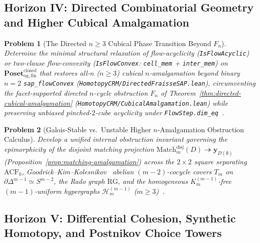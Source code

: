 \documentclass[10pt,twoside,openright]{book}
\theoremstyle{crmplain}
\newtheorem{problem}{Problem}[chapter]
\theoremstyle{crmdef}
\theoremstyle{crmremark}
\begin{document}
\subsection*{Horizon IV: Directed Combinatorial Geometry and Higher Cubical Amalgamation}

\begin{problem}[The Directed $n \ge 3$ Cubical Phase Transition Beyond $F_n$]\label{prob:open-7}
Determine the minimal structural relaxation of flow-acyclicity (\texttt{IsFlowAcyclic}) or two-clause flow-convexity (\texttt{IsFlowConvex}: \texttt{cell\_\allowbreak mem} + \texttt{inter\_\allowbreak mem}) on $\mathbf{Poset}_{\mathrm{og,fin}}^{\mathrm{closed}}$ that restores all-$n$ ($n \ge 3$) cubical $n$-amalgamation beyond binary $n = 2$ \texttt{sap\_\allowbreak flowConvex} (\texttt{HomotopyCRM/\allowbreak DirectedFraisseSAP.lean}), circumventing the facet-supported directed $n$-cycle obstruction $F_n$ of Theorem~\ref{thm:directed-cubical-amalgamation} (\texttt{HomotopyCRM/\allowbreak CubicalAmalgamation.lean}) while preserving unbiased pinched-$2$-cube acyclicity under \texttt{FlowStep.dim\_\allowbreak eq}~\cite{Masuda26}.
\end{problem}

\begin{problem}[Galois-Stable vs.\ Unstable Higher $n$-Amalgamation Obstruction Calculus]\label{prob:open-8}
Develop a unified internal obstruction invariant governing the epimorphicity of the disjoint matching projection $\mathrm{Match}_m^{\mathrm{disj}}(D) \twoheadrightarrow \mathbf{y}_{D(\emptyset)}$ (Proposition~\ref{prop:matching-amalgamation}) across the $2 \times 2$ square separating $\mathrm{ACF}_0$, Goodrick--Kim--Kolesnikov~\cite{GKK14} abelian $(m-2)$-cocycle covers $T_m$ on $\partial\Delta^{m-1} \simeq S^{m-2}$, the Rado graph $\mathrm{RG}$, and the homogeneous $K_m^{(m-1)}$-free $(m-1)$-uniform hypergraphs $\mathcal{H}_m^{(m-1)}$ ($m \ge 3$)~\cite{Kihara26}.
\end{problem}

\subsection*{Horizon V: Differential Cohesion, Synthetic Homotopy, and Postnikov Choice Towers}
\end{document}
